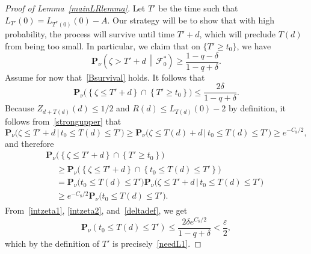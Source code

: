 \documentclass[AHL,Unicode,longabstracts,published]{cedram}
\newcommand*\eps{\varepsilon}
\renewcommand*\P{\mathbf{P}}
\newcommand\F{\mathcal{F}}
\newcommand{\1} {\mathds{1}}
\begin{document}
\begin{proof}[Proof of Lemma~\ref{mainLRlemma}]
Let $T'$ be the time such that $L_{T'}(0) = L_{T^*(0)}(0) - A$. Our strategy will be to show that with high probability, the process will survive until time $T' + d$, which will preclude $T(d)$ from being too small. In particular, we claim that on $\{T' \geq t_0\}$, we have
\begin{equation}\label{Bsurvival}
\P_{\nu}\left(\zeta > T' + d\,\middle|\,\F_0^*\right) \geq \frac{1 - q - \delta}{1 - q + \delta}.
\end{equation}
Assume for now that~\eqref{Bsurvival} holds. It follows that
\begin{equation}\label{intzeta1}
\P_{\nu}\big(\left\{\zeta \leq T' + d\right\} \cap \left\{T' \geq t_0\right\}\big) \leq \frac{2 \delta}{1 - q + \delta}.
\end{equation}
Because $Z_{d + T(d)}(d) \leq 1/2$ and $R(d) \leq L_{T(d)}(0) - 2$ by definition, it follows from~\eqref{strongupper} that
\[
\P_{\nu}\big(\zeta \leq T' + d\,\big|\,t_0 \leq T(d) \leq T'\big) \geq \P_{\nu}\big(\zeta \leq T(d) + d\,\big|\,t_0 \leq T(d) \leq T'\big) \geq e^{-C_8/2},
\]
and therefore
\begin{multline}\label{intzeta2}
\P_{\nu}\big(\left\{\zeta \leq T' + d\right\} \cap \left\{T' \geq t_0\right\}\big)\\
\begin{aligned}
&\geq \P_{\nu}\big(\left\{\zeta \leq T' + d\right\} \cap \left\{t_0 \leq T(d) \leq T'\right\}\big) \\
&= \P_{\nu}\big(t_0 \leq T(d) \leq T'\big) \P_{\nu}\big(\zeta \leq T' + d \,\big|\, t_0 \leq T(d) \leq T'\big) \\
&\geq e^{-C_8/2} \P_{\nu}\big(t_0 \leq T(d) \leq T'\big).
\end{aligned}
\end{multline}
From~\eqref{intzeta1}, \eqref{intzeta2}, and~\eqref{deltadef}, we get
\[
\P_{\nu}\left(t_0 \leq T(d) \leq T'\right) \leq \frac{2 \delta e^{C_8/2}}{1 - q + \delta} < \frac{\eps}{2},
\]
which by the definition of $T'$ is precisely~\eqref{needL1}.


\end{proof}
\end{document}
